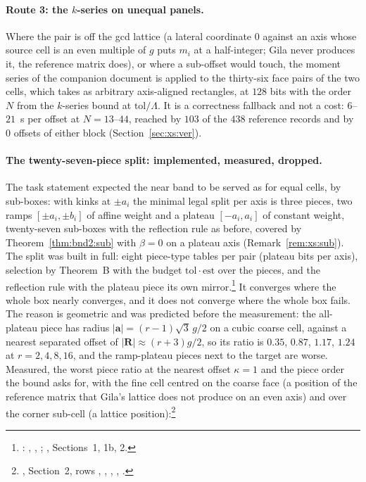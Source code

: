 \paragraph{Route 3: the $k$-series on unequal panels.} Where the pair is off the gcd lattice
(a lateral coordinate $0$ against an axis whose source cell is an even multiple of $g$ puts
$m_i$ at a half-integer; Gila never produces it, the reference matrix does), or where a
sub-offset would touch, the moment series of the companion document is applied to the
thirty-six face pairs of the two cells, which  takes as arbitrary
axis-aligned rectangles, at $128$ bits with the order $N$ from the $k$-series bound at
$\mathrm{tol}/\Lambda$. It is a correctness fallback and not a cost: $6$--$21$~s per offset
at $N = 13$--$44$, reached by $103$ of the $438$ reference records and by $0$ offsets of
either block (Section~\ref{sec:xs:ver}).

\paragraph{The twenty-seven-piece split: implemented, measured, dropped.} The task statement
expected the near band to be served as for equal cells, by sub-boxes: with kinks at $\pm a_i$
the minimal legal split per axis is three pieces, two ramps $[\pm a_i,\pm b_i]$ of affine
weight and a plateau $[-a_i,a_i]$ of constant weight, twenty-seven sub-boxes with the
reflection rule as before, covered by Theorem~\ref{thm:bnd2:sub} with $\beta = 0$ on a
plateau axis (Remark~\ref{rem:xs:sub}). The split was built in full: eight piece-type tables
per pair (plateau bits per axis), selection by Theorem~B with the budget
$\mathrm{tol}\cdot\mathrm{est}$ over the pieces, and the reflection rule with the plateau
piece its own mirror.\footnote{: ,
, ; , Sections~1, 1b, 2.} It converges
where the whole box nearly converges, and it does not converge where the whole box fails.
The reason is geometric and was predicted before the measurement: the all-plateau piece has
radius $|\mathbf{a}| = (r-1)\sqrt3\,g/2$ on a cubic coarse cell, against a nearest separated
offset of $|\mathbf{R}|\approx(r+3)g/2$, so its ratio is $0.35$, $0.87$, $1.17$, $1.24$ at
$r = 2,4,8,16$, and the ramp-plateau pieces next to the target are worse. Measured, the
worst piece ratio at the nearest offset $\kappa = 1$ and the piece order the bound asks
for, with the fine cell centred on the coarse face (a position of the reference matrix
that Gila's lattice does not produce on an even axis) and over the corner sub-cell (a
lattice position):\footnote{, Section~2, rows
, , , , .}

